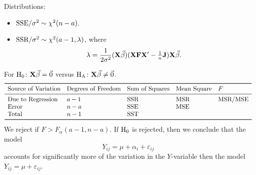 Distributions:
\begin{itemize}
    \item $ \text{SSE}/\sigma^2 \sim \chi^2(n-a) $.
    \item $ \text{SSR}/\sigma^2 \sim \chi^2(a-1,\lambda) $, where
          \[ \lambda=\frac{1}{2\sigma^2}(\mathbf{X}\vec{\beta})(\mathbf{X}\mathbf{F}\mathbf{X}'-\tfrac{1}{n}\mathbf{J})\mathbf{X}\vec{\beta}. \]
\end{itemize}
For $ \text{H}_0 $: $ \mathbf{X}\vec{\beta}=\vec{0} $ versus $ \text{H}_{\text{A}} $: $ \mathbf{X}\vec{\beta}\ne \vec{0} $.
\[ \begin{array}{lllll}
        \toprule
        \text{Source of Variation} & \text{Degrees of Freedom} & \text{Sum of Squares} & \text{Mean Square} & F         \\
        \midrule
        \text{Due to Regression}   & a-1                       & \SSR                  & \MSR               & \MSR/\MSE \\
        \text{Error}               & n-a                       & \SSE                  & \MSE                           \\
        \text{Total}               & n-1                       & \SST                                                   \\
        \bottomrule
    \end{array} \]
We reject if $ F>F_{\alpha}(a-1,n-a) $. If $ \text{H}_0 $ is rejected,
then we conclude that the model
\[ Y_{ij}=\mu+\alpha_i+\varepsilon_{ij} \]
accounts for significantly more of the variation in the $ Y $-variable
then the model $ Y_{ij}=\mu+\varepsilon_{ij} $.
